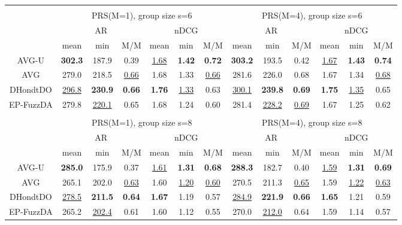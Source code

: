\begin{tabular}{ c | c c c | c c c || c c c | c c c }
\multicolumn{12}{c}{} \\
\multicolumn{1}{c}{} & \multicolumn{6}{c}{PRS(M=1), group size s=6} & \multicolumn{6}{c}{PRS(M=4), group size s=6} \\
\multicolumn{1}{c}{} & \multicolumn{3}{c}{AR} & \multicolumn{3}{c}{nDCG} & \multicolumn{3}{c}{AR} & \multicolumn{3}{c}{nDCG} \\
& mean & min & M/M & mean & min & M/M & mean & min & M/M & mean & min & M/M \\
\hline
AVG-U & \textbf{302.3} & 187.9 & 0.39 & \underline{1.68} & \textbf{1.42} & \textbf{0.72} & \textbf{303.2} & 193.5 & 0.42 & \underline{1.67} & \textbf{1.43} & \textbf{0.74} \\
AVG & 279.0 & 218.5 & \underline{0.66} & 1.68 & 1.33 & \underline{0.66} & 281.6 & 226.0 & 0.68 & 1.67 & 1.34 & \underline{0.68} \\
DHondtDO & \underline{296.8} & \textbf{230.9} & \textbf{0.66} & \textbf{1.76} & \underline{1.33} & 0.63 & \underline{300.1} & \textbf{239.8} & \textbf{0.69} & \textbf{1.75} & \underline{1.35} & 0.65 \\
EP-FuzzDA & 279.8 & \underline{220.1} & 0.65 & 1.68 & 1.24 & 0.60 & 281.4 & \underline{228.2} & \underline{0.69} & 1.67 & 1.25 & 0.62 \\

\multicolumn{12}{c}{} \\
\multicolumn{1}{c}{} & \multicolumn{6}{c}{PRS(M=1), group size s=8} & \multicolumn{6}{c}{PRS(M=4), group size s=8} \\
\multicolumn{1}{c}{} & \multicolumn{3}{c}{AR} & \multicolumn{3}{c}{nDCG} & \multicolumn{3}{c}{AR} & \multicolumn{3}{c}{nDCG} \\
& mean & min & M/M & mean & min & M/M & mean & min & M/M & mean & min & M/M \\
\hline
AVG-U & \textbf{285.0} & 175.9 & 0.37 & \underline{1.61} & \textbf{1.31} & \textbf{0.68} & \textbf{288.3} & 182.7 & 0.40 & \underline{1.59} & \textbf{1.31} & \textbf{0.69} \\
AVG & 265.1 & 202.0 & \underline{0.63} & 1.60 & \underline{1.20} & \underline{0.60} & 270.5 & 211.3 & \underline{0.65} & 1.59 & \underline{1.22} & \underline{0.63} \\
DHondtDO & \underline{278.5} & \textbf{211.5} & \textbf{0.64} & \textbf{1.67} & 1.19 & 0.57 & \underline{284.9} & \textbf{221.9} & \textbf{0.66} & \textbf{1.65} & 1.21 & 0.59 \\
EP-FuzzDA & 265.2 & \underline{202.4} & 0.61 & 1.60 & 1.12 & 0.55 & 270.0 & \underline{212.0} & 0.64 & 1.59 & 1.14 & 0.57 \\

\end{tabular}
